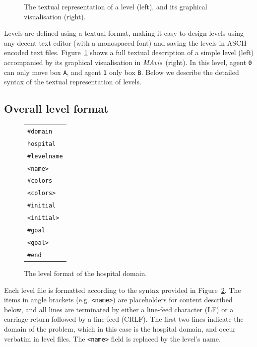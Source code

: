 \documentclass[12pt,a4paper]{article}
\def\mavis{{\itshape MAvis}}
\newcommand{\showlevel}[2]{%
    \scalebox{1}[.74]{%
        \begin{minipage}{#2}
            \renewcommand{\baselinestretch}{0.8}
            
            \renewcommand{\baselinestretch}{1.0}
        \end{minipage}
    }
}
\begin{document}
\begin{figure}
\begin{center}
    \scalebox{1.2}{\showlevel{levels/MAExample}{1.5cm}}
    \hspace{3cm}
\end{center}
\caption{The textual representation of a level (left), and its graphical visualisation (right).}\label{figu:textual}
\end{figure}
Levels are defined using a textual format, making it easy to design levels using any decent text editor (with a monospaced font) and saving the levels in ASCII-encoded text files. Figure~\ref{figu:textual} shows a full textual description of a simple level (left) accompanied by its graphical visualisation in \mavis\ (right). In this level, agent \texttt{0} can only move box \texttt{A}, and agent \texttt{1} only box \texttt{B}. Below we describe the detailed syntax of the textual representation of levels. 

\subsection{Overall level format} 
\begin{figure}
\begin{center}
\begin{tabular}{l}
\verb|#domain| \\
\verb|hospital| \\
\verb|#levelname| \\
\verb|<name>| \\
\verb|#colors| \\
\verb|<colors>| \\
\verb|#initial| \\
\verb|<initial>| \\
\verb|#goal| \\
\verb|<goal>| \\
\verb|#end| 
\end{tabular}
\end{center}
\caption{The level format of the hospital domain.}\label{figu:level-format}
\end{figure}
Each level file is formatted according to the syntax provided in Figure~\ref{figu:level-format}.
The items in angle brackets (e.g. \texttt{<name>}) are placeholders for content described below, and all lines are terminated by either a line-feed character (LF) or a carriage-return followed by a line-feed (CRLF).
The first two lines indicate the domain of the problem, which in this case is the hospital domain, and occur verbatim in level files. The \texttt{<name>} field is replaced by the level's name.
\end{document}
